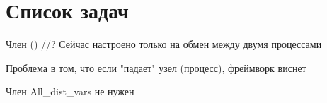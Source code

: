 \chapter{Список задач}
\hypertarget{todo}{}\label{todo}

\begin{DoxyRefList}
\item[Член \doxylink{class_s_r__ctl__type_a15aeb853304d28d278a2467752e5e3ef}{SR\+\_\+ctl\+\_\+type\+::Init\+\_\+local\+\_\+calc} ()]\label{todo__todo000002}%
%
//? Сейчас настроено только на обмен между двумя процессами 

\label{todo__todo000003}%
%
Проблема в том, что если "{}падает"{} узел (процесс), фреймворк виснет  
\item[Член \doxylink{class_s_r___settings_af0f347b91cae036e3ef341e829128ee4}{SR\+\_\+\+Settings\+::All\+\_\+dist\+\_\+vars} ]\label{todo__todo000001}%
%
All\+\_\+dist\+\_\+vars не нужен 
\end{DoxyRefList}